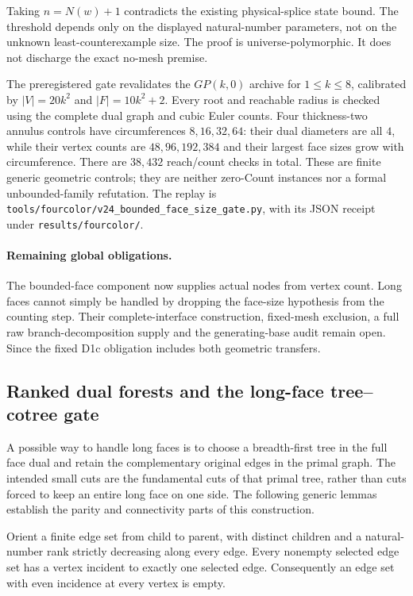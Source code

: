Taking $n=N(w)+1$ contradicts the existing physical-splice state bound.
The threshold depends only on the displayed natural-number parameters,
not on the unknown least-counterexample size.  The proof is
universe-polymorphic.  It does not discharge the exact no-mesh premise.

The preregistered gate revalidates the $GP(k,0)$ archive for $1\le k\le8$,
calibrated by $|V|=20k^2$ and $|F|=10k^2+2$.  Every root and reachable
radius is checked using the complete dual graph and cubic Euler counts.
Four thickness-two annulus controls have circumferences $8,16,32,64$:
their dual diameters are all $4$, while their vertex counts are
$48,96,192,384$ and their largest face sizes grow with circumference.
There are $38{,}432$ reach/count checks in total.  These are finite
generic geometric controls; they are neither zero-Count instances nor
a formal unbounded-family refutation.  The replay is
\texttt{tools/fourcolor/v24\_bounded\_face\_size\_gate.py}, with its
JSON receipt under \texttt{results/fourcolor/}.

\paragraph{Remaining global obligations.}
The bounded-face component now supplies actual nodes from vertex count.
Long faces cannot simply be handled by dropping the face-size hypothesis
from the counting step.  Their complete-interface construction, fixed-mesh
exclusion, a full raw branch-decomposition supply and the generating-base
audit remain open.  Since the fixed D1c obligation includes both geometric
transfers.

\subsection{Ranked dual forests and the long-face tree--cotree gate}
\label{sec:ranked-dual-forest}

A possible way to handle long faces is to choose a breadth-first tree in
the full face dual and retain the complementary original edges in the
primal graph.  The intended small cuts are the fundamental cuts of that
primal tree, rather than cuts forced to keep an entire long face on one
side.  The following generic lemmas establish the parity and connectivity
parts of this construction.

\begin{theorem}
Orient a finite edge set from child to parent, with distinct children and
a natural-number rank strictly decreasing along every edge.  Every
nonempty selected edge set has a vertex incident to exactly one selected
edge.  Consequently an edge set with even incidence at every vertex is
empty.
\end{theorem}

